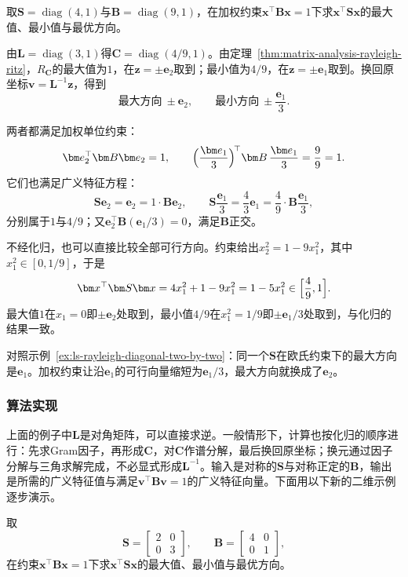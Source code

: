 \begin{example}[加权约束下的最优方向]
\label{ex:ls-generalized-rayleigh-diagonal}
取$\bm S=\operatorname{diag}(4,1)$与$\bm B=\operatorname{diag}(9,1)$，在加权约束$\bm x^\top\bm B\bm x=1$下求$\bm x^\top\bm S\bm x$的最大值、最小值与最优方向。

由$\bm L=\operatorname{diag}(3,1)$得$\bm C=\operatorname{diag}(4/9,1)$。由定理~\ref{thm:matrix-analysis-rayleigh-ritz}，$R_{\bm C}$的最大值为$1$，在$\bm z=\pm\bm e_2$取到；最小值为$4/9$，在$\bm z=\pm\bm e_1$取到。换回原坐标$\bm v=\bm L^{-1}\bm z$，得到
\[
 \text{最大方向}\ \pm\bm e_2,\qquad \text{最小方向}\ \pm\frac{\bm e_1}{3}.
\]

两者都满足加权单位约束：
\[
 \bm e_2^\top\bm B\bm e_2=1,\qquad \Bigl(\frac{\bm e_1}{3}\Bigr)^{\!\top}\bm B\,\frac{\bm e_1}{3}=\frac99=1 .
\]
它们也满足广义特征方程：
\[
 \bm S\bm e_2=\bm e_2=1\cdot\bm B\bm e_2,\qquad
 \bm S\frac{\bm e_1}{3}=\frac43\bm e_1=\frac49\cdot\bm B\frac{\bm e_1}{3},
\]
分别属于$1$与$4/9$；又$\bm e_2^\top\bm B(\bm e_1/3)=0$，满足$\bm B$正交。

不经化归，也可以直接比较全部可行方向。约束给出$x_2^2=1-9x_1^2$，其中$x_1^2\in[0,1/9]$，于是
\[
 \bm x^\top\bm S\bm x=4x_1^2+1-9x_1^2=1-5x_1^2\in\Bigl[\frac49,1\Bigr].
\]
最大值$1$在$x_1=0$即$\pm\bm e_2$处取到，最小值$4/9$在$x_1^2=1/9$即$\pm\bm e_1/3$处取到，与化归的结果一致。

对照示例~\ref{ex:ls-rayleigh-diagonal-two-by-two}：同一个$\bm S$在欧氏约束下的最大方向是$\bm e_1$。加权约束让沿$\bm e_1$的可行向量缩短为$\bm e_1/3$，最大方向就换成了$\bm e_2$。
\end{example}

\subsubsection{算法实现}

上面的例子中$\bm L$是对角矩阵，可以直接求逆。一般情形下，计算也按化归的顺序进行：先求Gram因子，再形成$\bm C$，对$\bm C$作谱分解，最后换回原坐标；换元通过因子分解与三角求解完成，不必显式形成$\bm L^{-1}$。输入是对称的$\bm S$与对称正定的$\bm B$，输出是所需的广义特征值与满足$\bm v^\top\bm B\bm v=1$的广义特征向量。下面用以下新的二维示例逐步演示。

\begin{example}[按三角求解的步骤计算]
\label{ex:matrix-approximation-generalized-cholesky}
取
\[
 \bm S=\begin{bmatrix}2&0\\0&3\end{bmatrix},\qquad
 \bm B=\begin{bmatrix}4&0\\0&1\end{bmatrix},
\]
在约束$\bm x^\top\bm B\bm x=1$下求$\bm x^\top\bm S\bm x$的最大值、最小值与最优方向。
\end{example}

